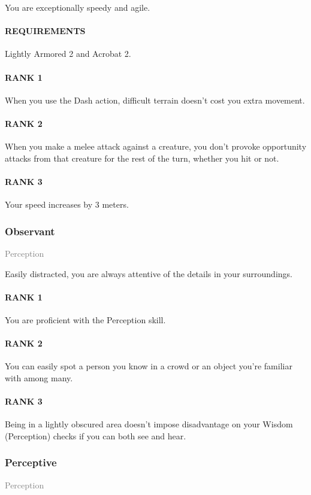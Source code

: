 \normalsize
You are exceptionally speedy and agile.
\paragraph{REQUIREMENTS} Lightly Armored 2 and Acrobat 2.
\paragraph{RANK 1} When you use the Dash action, difficult terrain doesn't cost you extra movement.
\paragraph{RANK 2} When you make a melee attack against a creature, you don't provoke opportunity attacks from that creature for the rest of the turn, whether you hit or not.
\paragraph{RANK 3} Your speed increases by 3 meters.

\subsubsection{Observant} \label{feat::observant}
\small{\textcolor{gray}{Perception}}

\normalsize
Easily distracted, you are always attentive of the details in your surroundings.
\paragraph{RANK 1} You are proficient with the Perception skill.
\paragraph{RANK 2} You can easily spot a person you know in a crowd or an object you're familiar with among many.
\paragraph{RANK 3} Being in a lightly obscured area doesn't impose disadvantage on your Wisdom (Perception) checks if you can both see and hear.

\subsubsection{Perceptive} \label{feat::perceptive}
\small{\textcolor{gray}{Perception}}

